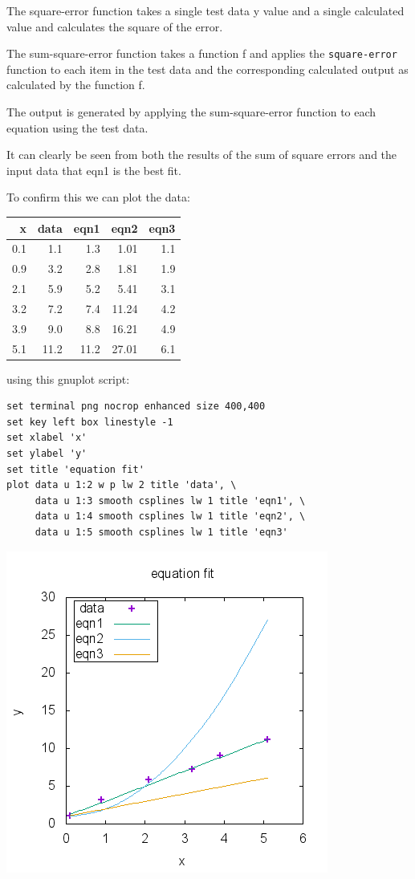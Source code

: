 \documentclass[11pt]{article}
\begin{document}
The square-error function takes a single test data y value and a
single calculated value and calculates the square of the error.

The sum-square-error function takes a function f and applies the
\texttt{square-error} function to each item in the test data and the
corresponding calculated output as calculated by the function f.

The output is generated by applying the  sum-square-error function to
each equation using the test data.

It can clearly be seen from both the results of the sum of square
errors and the input data that eqn1 is the best fit.

To confirm this we can plot the data:

\begin{center}
\begin{tabular}{rrrrr}
x & data & eqn1 & eqn2 & eqn3\\
\hline
0.1 & 1.1 & 1.3 & 1.01 & 1.1\\
0.9 & 3.2 & 2.8 & 1.81 & 1.9\\
2.1 & 5.9 & 5.2 & 5.41 & 3.1\\
3.2 & 7.2 & 7.4 & 11.24 & 4.2\\
3.9 & 9.0 & 8.8 & 16.21 & 4.9\\
5.1 & 11.2 & 11.2 & 27.01 & 6.1\\
\end{tabular}
\end{center}

using this gnuplot script:

\begin{verbatim}
set terminal png nocrop enhanced size 400,400
set key left box linestyle -1
set xlabel 'x'
set ylabel 'y'
set title 'equation fit'
plot data u 1:2 w p lw 2 title 'data', \
     data u 1:3 smooth csplines lw 1 title 'eqn1', \
     data u 1:4 smooth csplines lw 1 title 'eqn2', \
     data u 1:5 smooth csplines lw 1 title 'eqn3'
\end{verbatim}
\includegraphics[width=.9\linewidth]{example1-plot.png}
\end{document}

